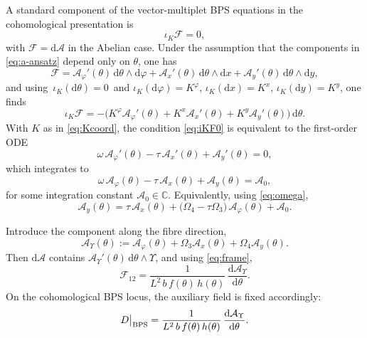 \documentclass[11pt,a4paper]{article}
\numberwithin{equation}{section}
\theoremstyle{plain}
\theoremstyle{definition}
\theoremstyle{remark}
\newcommand{\dd}{\mathrm{d}}
\begin{document}
A standard component of the vector-multiplet BPS equations in the cohomological presentation is
\begin{equation}
\iota_K\mathcal F=0,
\label{eq:iKF0}
\end{equation}
with $\mathcal F=\dd\mathcal A$ in the Abelian case. Under the assumption that the components in \eqref{eq:a-ansatz}
depend only on $\theta$, one has
\[
\mathcal F = \mathcal A_\varphi'(\theta)\,\dd\theta\wedge \dd\varphi
+ \mathcal A_x'(\theta)\,\dd\theta\wedge \dd x
+ \mathcal A_y'(\theta)\,\dd\theta\wedge \dd y,
\]
and using $\,\iota_K(\dd\theta)=0\,$ and $\iota_K(\dd\varphi)=K^\varphi$, $\iota_K(\dd x)=K^x$, $\iota_K(\dd y)=K^y$, one finds
\[
\iota_K\mathcal F
=
-\Big(K^\varphi \mathcal A_\varphi'(\theta)+K^x \mathcal A_x'(\theta)+K^y \mathcal A_y'(\theta)\Big)\,\dd\theta.
\]
With $K$ as in \eqref{eq:Kcoord}, the condition \eqref{eq:iKF0} is equivalent to the first-order ODE
\begin{equation}
\omega\,\mathcal A_\varphi'(\theta)-\tau\,\mathcal A_x'(\theta)+\mathcal A_y'(\theta)=0,
\label{eq:BPS-ODE}
\end{equation}
which integrates to
\begin{equation}
\omega\,\mathcal A_\varphi(\theta)-\tau\,\mathcal A_x(\theta)+\mathcal A_y(\theta)=\mathcal A_0,
\label{eq:a0-def}
\end{equation}
for some integration constant $\mathcal A_0\in\mathbb{C}$. Equivalently, using \eqref{eq:omega},
\begin{equation}
\mathcal A_y(\theta)=\tau\,\mathcal A_x(\theta)+\big(\Omega_4-\tau\Omega_3\big)\,\mathcal A_\varphi(\theta)+\mathcal A_0 .
\label{eq:ay-solution}
\end{equation}


Introduce the component along the fibre direction,
\begin{equation}
\mathcal A_\Upsilon(\theta):=\mathcal A_\varphi(\theta)+\Omega_3 \mathcal A_x(\theta)+\Omega_4 \mathcal A_y(\theta).
\label{eq:aUpsilon}
\end{equation}
Then $\dd\mathcal A$ contains $\mathcal A_\Upsilon'(\theta)\,\dd\theta\wedge\Upsilon$, and using \eqref{eq:frame},
\begin{equation}
\mathcal F_{12}
=
\frac{1}{L^2\,b\,f(\theta)\,h(\theta)}\,\frac{\dd \mathcal A_\Upsilon}{\dd\theta}.
\label{eq:F12}
\end{equation}
On the cohomological BPS locus, the auxiliary field is fixed accordingly:
\begin{equation}
D\big|_{\rm BPS}
=
\frac{1}{L^2\,b\,f(\theta)\,h(\theta)}\,\frac{\dd \mathcal A_\Upsilon}{\dd\theta}.
\label{eq:DBPS-trig}
\end{equation}
\end{document}
